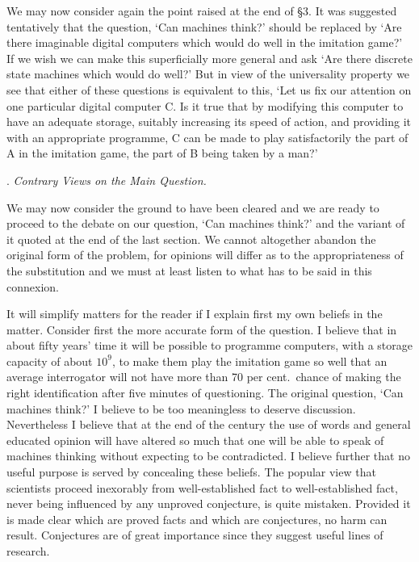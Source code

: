 \documentclass[10pt]{article} %
\begin{document}
We may now consider again the point raised at the end of \S 3. It was suggested tentatively that the question, `Can machines think?' should be replaced by `Are there imaginable digital computers which would do well in the imitation game?' If we wish we can make this superficially more general and ask `Are there discrete state machines which would do well?' But in view of the universality property we see that either of these questions is equivalent to this, `Let us fix our attention on one particular digital computer C. Is it true that by modifying this computer to have an adequate storage, suitably increasing its speed of action, and providing it with an appropriate programme, C can be made to play satisfactorily the part of A in the imitation game, the part of B being taken by a man?'

\vspace{0.5\baselineskip} %
\noindent{}. \textit{Contrary Views on the Main Question.}
\vspace{0.5\baselineskip} %

We may now consider the ground to have been cleared and we are ready to proceed to the debate on our question, `Can machines think?' and the variant of it quoted at the end of the last section. We cannot altogether abandon the original form of the problem, for opinions will differ as to the appropriateness of the substitution and we must at least listen to what has to be said in this connexion.

It will simplify matters for the reader if I explain first my own beliefs in the matter. Consider first the more accurate form of the question. I believe that in about fifty years' time it will be possible to programme computers, with a storage capacity of about $10^9$, to make them play the imitation game so well that an average interrogator will not have more than 70 per cent.~chance of making the right identification after five minutes of questioning. The original question, `Can machines think?' I believe to be too meaningless to deserve discussion. Nevertheless I believe that at the end of the century the use of words and general educated opinion will have altered so much that one will be able to speak of machines thinking without expecting to be contradicted. I believe further that no useful purpose is served by concealing these beliefs. The popular view that scientists proceed inexorably from well-established fact to well-established fact, never being influenced by any unproved conjecture, is quite mistaken. Provided it is made clear which are proved facts and which are conjectures, no harm can result. Conjectures are of great importance since they suggest useful lines of research.
\end{document}
